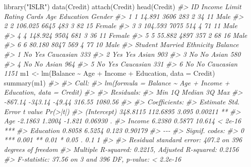 \documentclass[
]{book}
\newenvironment{Shaded}{\begin{snugshade}}{\end{snugshade}}
\newcommand{\AttributeTok}[1]{\textcolor[rgb]{0.77,0.63,0.00}{#1}}
\newcommand{\CommentTok}[1]{\textcolor[rgb]{0.56,0.35,0.01}{\textit{#1}}}
\newcommand{\FunctionTok}[1]{\textcolor[rgb]{0.00,0.00,0.00}{#1}}
\newcommand{\NormalTok}[1]{#1}
\newcommand{\OtherTok}[1]{\textcolor[rgb]{0.56,0.35,0.01}{#1}}
\newcommand{\SpecialCharTok}[1]{\textcolor[rgb]{0.00,0.00,0.00}{#1}}
\newcommand{\StringTok}[1]{\textcolor[rgb]{0.31,0.60,0.02}{#1}}
\begin{document}
\begin{Shaded}
\begin{Highlighting}[]
\FunctionTok{library}\NormalTok{(}\StringTok{"ISLR"}\NormalTok{)}
\FunctionTok{data}\NormalTok{(Credit)}
\FunctionTok{attach}\NormalTok{(Credit)}
\FunctionTok{head}\NormalTok{(Credit)}
\CommentTok{\#\textgreater{}   ID  Income Limit Rating Cards Age Education Gender}
\CommentTok{\#\textgreater{} 1  1  14.891  3606    283     2  34        11   Male}
\CommentTok{\#\textgreater{} 2  2 106.025  6645    483     3  82        15 Female}
\CommentTok{\#\textgreater{} 3  3 104.593  7075    514     4  71        11   Male}
\CommentTok{\#\textgreater{} 4  4 148.924  9504    681     3  36        11 Female}
\CommentTok{\#\textgreater{} 5  5  55.882  4897    357     2  68        16   Male}
\CommentTok{\#\textgreater{} 6  6  80.180  8047    569     4  77        10   Male}
\CommentTok{\#\textgreater{}   Student Married Ethnicity Balance}
\CommentTok{\#\textgreater{} 1      No     Yes Caucasian     333}
\CommentTok{\#\textgreater{} 2     Yes     Yes     Asian     903}
\CommentTok{\#\textgreater{} 3      No      No     Asian     580}
\CommentTok{\#\textgreater{} 4      No      No     Asian     964}
\CommentTok{\#\textgreater{} 5      No     Yes Caucasian     331}
\CommentTok{\#\textgreater{} 6      No      No Caucasian    1151}
\NormalTok{m1 }\OtherTok{\textless{}{-}} \FunctionTok{lm}\NormalTok{(Balance }\SpecialCharTok{\textasciitilde{}}\NormalTok{ Age }\SpecialCharTok{+}\NormalTok{ Income }\SpecialCharTok{+}\NormalTok{ Education, }\AttributeTok{data =}\NormalTok{ Credit)}
\FunctionTok{summary}\NormalTok{(m1)}
\CommentTok{\#\textgreater{} }
\CommentTok{\#\textgreater{} Call:}
\CommentTok{\#\textgreater{} lm(formula = Balance \textasciitilde{} Age + Income + Education, data = Credit)}
\CommentTok{\#\textgreater{} }
\CommentTok{\#\textgreater{} Residuals:}
\CommentTok{\#\textgreater{}     Min      1Q  Median      3Q     Max }
\CommentTok{\#\textgreater{} {-}867.14 {-}343.14  {-}49.44  316.55 1080.56 }
\CommentTok{\#\textgreater{} }
\CommentTok{\#\textgreater{} Coefficients:}
\CommentTok{\#\textgreater{}             Estimate Std. Error t value Pr(\textgreater{}|t|)    }
\CommentTok{\#\textgreater{} (Intercept) 348.8115   112.6895   3.095  0.00211 ** }
\CommentTok{\#\textgreater{} Age          {-}2.1863     1.2004  {-}1.821  0.06930 .  }
\CommentTok{\#\textgreater{} Income        6.2380     0.5877  10.614  \textless{} 2e{-}16 ***}
\CommentTok{\#\textgreater{} Education     0.8058     6.5254   0.123  0.90179    }
\CommentTok{\#\textgreater{} {-}{-}{-}}
\CommentTok{\#\textgreater{} Signif. codes:  }
\CommentTok{\#\textgreater{} 0 \textquotesingle{}***\textquotesingle{} 0.001 \textquotesingle{}**\textquotesingle{} 0.01 \textquotesingle{}*\textquotesingle{} 0.05 \textquotesingle{}.\textquotesingle{} 0.1 \textquotesingle{} \textquotesingle{} 1}
\CommentTok{\#\textgreater{} }
\CommentTok{\#\textgreater{} Residual standard error: 407.2 on 396 degrees of freedom}
\CommentTok{\#\textgreater{} Multiple R{-}squared:  0.2215, Adjusted R{-}squared:  0.2156 }
\CommentTok{\#\textgreater{} F{-}statistic: 37.56 on 3 and 396 DF,  p{-}value: \textless{} 2.2e{-}16}
\end{Highlighting}
\end{Shaded}
\end{document}
